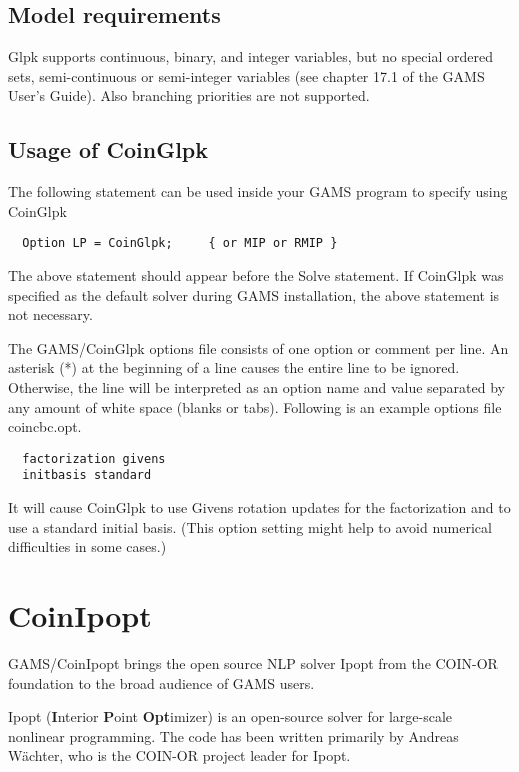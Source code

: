 \subsection{Model requirements}

Glpk supports continuous, binary, and integer variables, but no special ordered sets, semi-continuous or semi-integer variables (see chapter 17.1 of the GAMS User's Guide).
Also branching priorities are not supported.

\subsection{Usage of CoinGlpk}

The following statement can be used inside your GAMS program to specify using CoinGlpk
\begin{verbatim}
  Option LP = CoinGlpk;     { or MIP or RMIP }
\end{verbatim}

The above statement should appear before the Solve statement.
If CoinGlpk was specified as the default solver during GAMS installation, the above statement is not necessary.

The GAMS/CoinGlpk options file consists of one option or comment per line.
An asterisk (*) at the beginning of a line causes the entire line to be ignored.
Otherwise, the line will be interpreted as an option name and value separated by any amount of white space (blanks or tabs).
Following is an example options file coincbc.opt.
\begin{verbatim}
  factorization givens
  initbasis standard
\end{verbatim}
It will cause CoinGlpk to use Givens rotation updates for the factorization and to use a standard initial basis. (This option setting might help to avoid numerical difficulties in some cases.)






\section{CoinIpopt}

GAMS/CoinIpopt brings the open source NLP solver Ipopt from the COIN-OR foundation to the broad audience of GAMS users.

Ipopt (\textbf{I}nterior \textbf{P}oint \textbf{Opt}imizer) is an open-source solver for large-scale nonlinear programming.
The code has been written primarily by Andreas W\"achter, who is the COIN-OR project leader for Ipopt.

